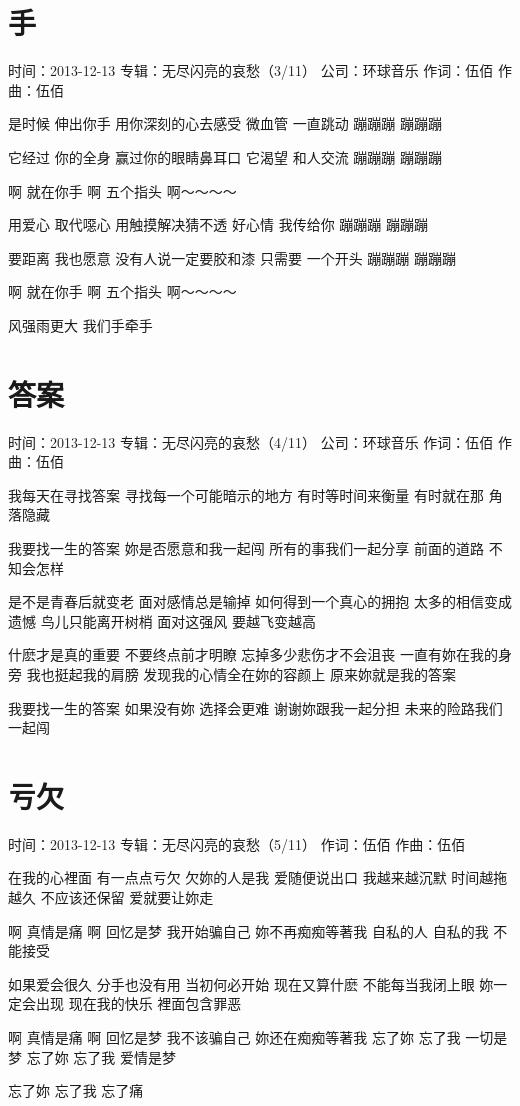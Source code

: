\documentclass[UTF8,a4paper,oneside,twocolumn,12pt]{ctexbook}
\newcommand{\infopair}[2]{\textbullet #1：#2}
\newcommand{\zc}[1][伍佰]{\infopair{作词}{#1}}
\newcommand{\zq}[1][伍佰]{\infopair{作曲}{#1}}
\newcommand{\zj}[1]{\infopair{专辑}{#1}}
\newcommand{\sj}[1]{\infopair{时间}{#1}}
\newcommand{\gs}[1]{\infopair{公司}{#1}}
\newenvironment{info}{\begin{flushleft}\kaishu
	}
	{\end{flushleft}\normalsize\yahei\par}
\newenvironment{lyric}{
	}
{}
\begin{document}
\section{手}
\begin{info}
	\sj{2013-12-13}
	\zj{无尽闪亮的哀愁（3/11）}
	\gs{环球音乐}
	\zc
	\zq
\end{info}
\begin{lyric}
	是时候 伸出你手
	用你深刻的心去感受
	微血管 一直跳动
	蹦蹦蹦 蹦蹦蹦

	它经过 你的全身
	赢过你的眼睛鼻耳口
	它渴望 和人交流
	蹦蹦蹦 蹦蹦蹦

	啊 就在你手
	啊 五个指头
	啊～～～～

	用爱心 取代噁心
	用触摸解决猜不透
	好心情 我传给你
	蹦蹦蹦 蹦蹦蹦

	要距离 我也愿意
	没有人说一定要胶和漆
	只需要 一个开头
	蹦蹦蹦 蹦蹦蹦

	啊 就在你手
	啊 五个指头
	啊～～～～

	风强雨更大
	我们手牵手
\end{lyric}

\section{答案}
\begin{info}
	\sj{2013-12-13}
	\zj{无尽闪亮的哀愁（4/11）}
	\gs{环球音乐}
	\zc
	\zq
\end{info}
\begin{lyric}
	我每天在寻找答案
	寻找每一个可能暗示的地方
	有时等时间来衡量
	有时就在那 角落隐藏

	我要找一生的答案
	妳是否愿意和我一起闯
	所有的事我们一起分享
	前面的道路 不知会怎样

	是不是青春后就变老 面对感情总是输掉
	如何得到一个真心的拥抱
	太多的相信变成遗憾 鸟儿只能离开树梢
	面对这强风 要越飞变越高

	什麽才是真的重要 不要终点前才明瞭
	忘掉多少悲伤才不会沮丧
	一直有妳在我的身旁 我也挺起我的肩膀
	发现我的心情全在妳的容颜上
	原来妳就是我的答案

	我要找一生的答案
	如果没有妳 选择会更难
	谢谢妳跟我一起分担
	未来的险路我们一起闯
\end{lyric}

\section{亏欠}
\begin{info}
	\sj{2013-12-13}
	\zj{无尽闪亮的哀愁（5/11）}
	\zc
	\zq
\end{info}
\begin{lyric}
	在我的心裡面 有一点点亏欠
	欠妳的人是我 爱随便说出口
	我越来越沉默 时间越拖越久
	不应该还保留 爱就要让妳走

	啊 真情是痛
	啊 回忆是梦
	我开始骗自己 妳不再痴痴等著我
	自私的人 自私的我 不能接受

	如果爱会很久 分手也没有用
	当初何必开始 现在又算什麽
	不能每当我闭上眼 妳一定会出现
	现在我的快乐 裡面包含罪恶

	啊 真情是痛
	啊 回忆是梦
	我不该骗自己 妳还在痴痴等著我
	忘了妳 忘了我 一切是梦
	忘了妳 忘了我 爱情是梦

	忘了妳 忘了我 忘了痛
\end{lyric}
\end{document}
